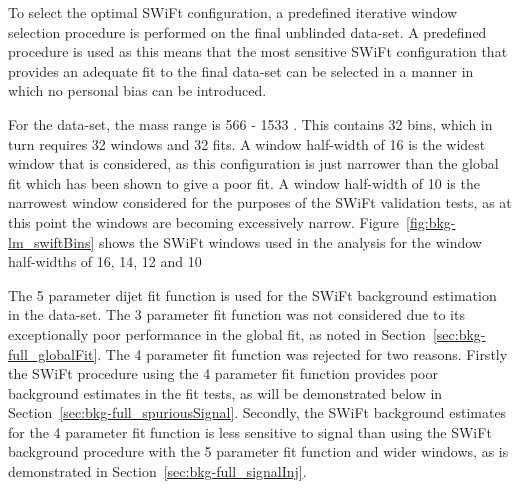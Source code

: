 To select the optimal SWiFt configuration, a predefined iterative window selection procedure is performed on the final unblinded data-set.
A predefined procedure is used as this means that the most sensitive SWiFt configuration that provides an adequate fit to the final data-set can be selected
in a manner in which no personal bias can be introduced.




For the \lm{} data-set, the mass range is 566 - 1533 \GeV{}. This contains 32 bins, which in turn requires 32 windows and 32 fits.
A window half-width of 16 is  the widest window that is considered,
as this configuration is just narrower than the global fit which has been shown to give a poor fit.
A window half-width of 10 is the narrowest window considered for the purposes of the SWiFt validation tests,
as at this point the windows are becoming excessively narrow.
Figure~\ref{fig:bkg-lm_swiftBins} shows the SWiFt windows used in the \lm{} analysis for the window half-widths of 16, 14, 12 and 10

The 5 parameter dijet fit function is used for the SWiFt background estimation in the \lm{} data-set.
The 3 parameter fit function was not considered due to its exceptionally poor performance in the global fit, as noted in Section~\ref{sec:bkg-full_globalFit}.
The 4 parameter fit function was rejected for two reasons.
Firstly the SWiFt procedure using the 4 parameter fit function provides poor background estimates in the fit tests,
as will be demonstrated below in Section~\ref{sec:bkg-full_spuriousSignal}.
Secondly, the SWiFt background estimates for the 4 parameter fit function is less sensitive to signal than
using the SWiFt background procedure with the 5 parameter fit function and wider windows, as is demonstrated in Section~\ref{sec:bkg-full_signalInj}.

